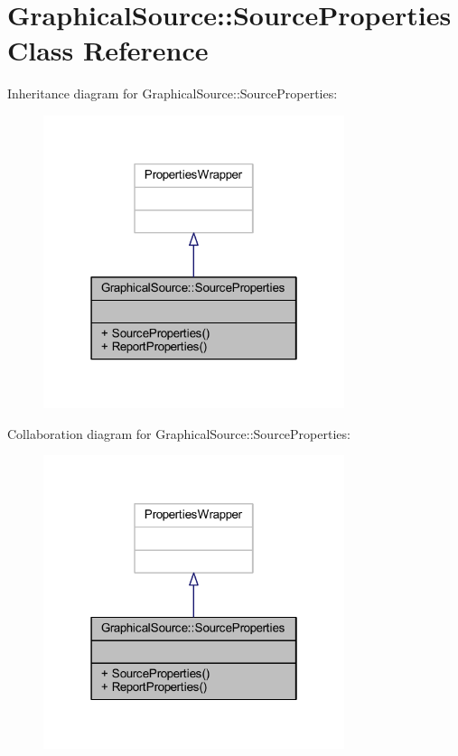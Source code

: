 \hypertarget{class_graphical_source_1_1_source_properties}{}\section{Graphical\+Source\+:\+:Source\+Properties Class Reference}
\label{class_graphical_source_1_1_source_properties}


Inheritance diagram for Graphical\+Source\+:\+:Source\+Properties\+:
\nopagebreak
\begin{figure}[H]
\begin{center}
\leavevmode
\includegraphics[width=250pt]{class_graphical_source_1_1_source_properties__inherit__graph}
\end{center}
\end{figure}


Collaboration diagram for Graphical\+Source\+:\+:Source\+Properties\+:
\nopagebreak
\begin{figure}[H]
\begin{center}
\leavevmode
\includegraphics[width=250pt]{class_graphical_source_1_1_source_properties__coll__graph}
\end{center}
\end{figure}

